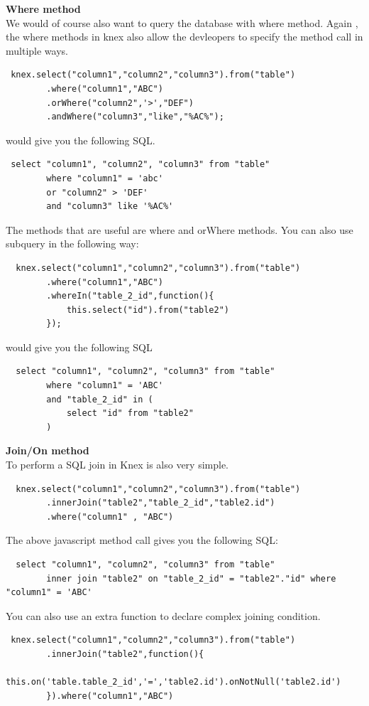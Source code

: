 \documentclass[a4paper]{article}
\begin{document}
\textbf{Where method}\\
We would of course also want to query the database with where method. Again , the where methods in knex also allow the devleopers to specify the method call in multiple ways.
\begin{lstlisting}
 knex.select("column1","column2","column3").from("table")
        .where("column1","ABC")
        .orWhere("column2",'>',"DEF")
        .andWhere("column3","like","%AC%");
\end{lstlisting}
would give you the following SQL.
\begin{lstlisting}
 select "column1", "column2", "column3" from "table" 
        where "column1" = 'abc' 
        or "column2" > 'DEF' 
        and "column3" like '%AC%'
\end{lstlisting}
The methods that are useful are where and orWhere methods. You can also use subquery in the following way:
\begin{lstlisting}
  knex.select("column1","column2","column3").from("table")
        .where("column1","ABC")
        .whereIn("table_2_id",function(){
            this.select("id").from("table2")
        });
\end{lstlisting}
would give you the following SQL
\begin{lstlisting}
  select "column1", "column2", "column3" from "table" 
        where "column1" = 'ABC' 
        and "table_2_id" in (
            select "id" from "table2"
        )
\end{lstlisting}
\textbf{Join/On method}\\
To perform a SQL join in Knex is also very simple.
\begin{lstlisting}
  knex.select("column1","column2","column3").from("table")
        .innerJoin("table2","table_2_id","table2.id")
        .where("column1" , "ABC")
\end{lstlisting}
The above javascript method call gives you the following SQL:
\begin{lstlisting}
  select "column1", "column2", "column3" from "table" 
        inner join "table2" on "table_2_id" = "table2"."id" where "column1" = 'ABC'
\end{lstlisting}
You can also use an extra function to declare complex joining condition.
\begin{lstlisting}
 knex.select("column1","column2","column3").from("table")
        .innerJoin("table2",function(){
            this.on('table.table_2_id','=','table2.id').onNotNull('table2.id')
        }).where("column1","ABC")
\end{lstlisting}
\end{document}
